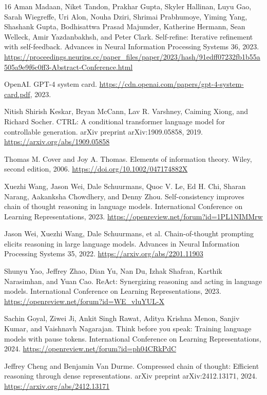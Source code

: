 \documentclass[11pt]{article}
\begin{document}
\begin{thebibliography}{16}
Aman Madaan, Niket Tandon, Prakhar Gupta, Skyler Hallinan, Luyu Gao, Sarah Wiegreffe, Uri Alon, Nouha Dziri, Shrimai Prabhumoye, Yiming Yang, Shashank Gupta, Bodhisattwa Prasad Majumder, Katherine Hermann, Sean Welleck, Amir Yazdanbakhsh, and Peter Clark.
\newblock Self-refine: Iterative refinement with self-feedback.
\newblock Advances in Neural Information Processing Systems 36, 2023.
\newblock \url{https://proceedings.neurips.cc/paper_files/paper/2023/hash/91edff07232fb1b55a505a9e9f6c0ff3-Abstract-Conference.html}

OpenAI.
\newblock GPT-4 system card.
\newblock \url{https://cdn.openai.com/papers/gpt-4-system-card.pdf}, 2023.

Nitish Shirish Keskar, Bryan McCann, Lav R. Varshney, Caiming Xiong, and Richard Socher.
\newblock CTRL: A conditional transformer language model for controllable generation.
\newblock arXiv preprint arXiv:1909.05858, 2019.
\newblock \url{https://arxiv.org/abs/1909.05858}

Thomas M. Cover and Joy A. Thomas.
\newblock Elements of information theory.
\newblock Wiley, second edition, 2006.
\newblock \url{https://doi.org/10.1002/047174882X}

Xuezhi Wang, Jason Wei, Dale Schuurmans, Quoc V. Le, Ed H. Chi, Sharan Narang, Aakanksha Chowdhery, and Denny Zhou.
\newblock Self-consistency improves chain of thought reasoning in language models.
\newblock International Conference on Learning Representations, 2023.
\newblock \url{https://openreview.net/forum?id=1PL1NIMMrw}

Jason Wei, Xuezhi Wang, Dale Schuurmans, et al.
\newblock Chain-of-thought prompting elicits reasoning in large language models.
\newblock Advances in Neural Information Processing Systems 35, 2022.
\newblock \url{https://arxiv.org/abs/2201.11903}

Shunyu Yao, Jeffrey Zhao, Dian Yu, Nan Du, Izhak Shafran, Karthik Narasimhan, and Yuan Cao.
\newblock ReAct: Synergizing reasoning and acting in language models.
\newblock International Conference on Learning Representations, 2023.
\newblock \url{https://openreview.net/forum?id=WE_vluYUL-X}

Sachin Goyal, Ziwei Ji, Ankit Singh Rawat, Aditya Krishna Menon, Sanjiv Kumar, and Vaishnavh Nagarajan.
\newblock Think before you speak: Training language models with pause tokens.
\newblock International Conference on Learning Representations, 2024.
\newblock \url{https://openreview.net/forum?id=ph04CRkPdC}

Jeffrey Cheng and Benjamin Van Durme.
\newblock Compressed chain of thought: Efficient reasoning through dense representations.
\newblock arXiv preprint arXiv:2412.13171, 2024.
\newblock \url{https://arxiv.org/abs/2412.13171}
\end{thebibliography}
\end{document}
